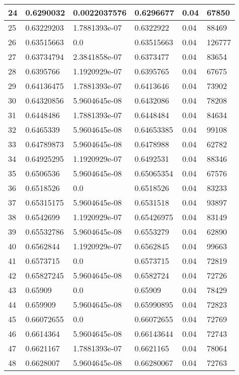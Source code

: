\begin{longtable}{|l|l|l|l|l|l|}
24 & 0.6290032 & 0.0022037576 & 0.6296677 & 0.04 & 67850 \\ \hline 
25 & 0.63229203 & 1.7881393e-07 & 0.6322922 & 0.04 & 88469 \\ \hline 
26 & 0.63515663 & 0.0 & 0.63515663 & 0.04 & 126777 \\ \hline 
27 & 0.63734794 & 2.3841858e-07 & 0.6373477 & 0.04 & 83654 \\ \hline 
28 & 0.6395766 & 1.1920929e-07 & 0.6395765 & 0.04 & 67675 \\ \hline 
29 & 0.64136475 & 1.7881393e-07 & 0.6413646 & 0.04 & 73902 \\ \hline 
30 & 0.64320856 & 5.9604645e-08 & 0.6432086 & 0.04 & 78208 \\ \hline 
31 & 0.6448486 & 1.7881393e-07 & 0.6448484 & 0.04 & 84634 \\ \hline 
32 & 0.6465339 & 5.9604645e-08 & 0.64653385 & 0.04 & 99108 \\ \hline 
33 & 0.64789873 & 5.9604645e-08 & 0.6478988 & 0.04 & 62782 \\ \hline 
34 & 0.64925295 & 1.1920929e-07 & 0.6492531 & 0.04 & 88346 \\ \hline 
35 & 0.6506536 & 5.9604645e-08 & 0.65065354 & 0.04 & 67576 \\ \hline 
36 & 0.6518526 & 0.0 & 0.6518526 & 0.04 & 83233 \\ \hline 
37 & 0.65315175 & 5.9604645e-08 & 0.6531518 & 0.04 & 93897 \\ \hline 
38 & 0.6542699 & 1.1920929e-07 & 0.65426975 & 0.04 & 83149 \\ \hline 
39 & 0.65532786 & 5.9604645e-08 & 0.6553279 & 0.04 & 62890 \\ \hline 
40 & 0.6562844 & 1.1920929e-07 & 0.6562845 & 0.04 & 99663 \\ \hline 
41 & 0.6573715 & 0.0 & 0.6573715 & 0.04 & 72819 \\ \hline 
42 & 0.65827245 & 5.9604645e-08 & 0.6582724 & 0.04 & 72726 \\ \hline 
43 & 0.65909 & 0.0 & 0.65909 & 0.04 & 78429 \\ \hline 
44 & 0.659909 & 5.9604645e-08 & 0.65990895 & 0.04 & 72823 \\ \hline 
45 & 0.66072655 & 0.0 & 0.66072655 & 0.04 & 72769 \\ \hline 
46 & 0.6614364 & 5.9604645e-08 & 0.66143644 & 0.04 & 72743 \\ \hline 
47 & 0.6621167 & 1.7881393e-07 & 0.6621165 & 0.04 & 78064 \\ \hline 
48 & 0.6628007 & 5.9604645e-08 & 0.66280067 & 0.04 & 72763 \\ \hline 

\end{longtable}
